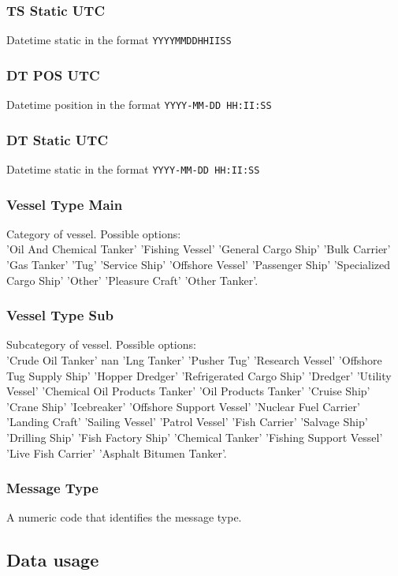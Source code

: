         \subsubsection{TS Static UTC}
            Datetime static in the format \verb|YYYYMMDDHHIISS|
        \subsubsection{DT POS UTC}
            Datetime position in the format \verb|YYYY-MM-DD HH:II:SS|
        \subsubsection{DT Static UTC}
            Datetime static in the format \verb|YYYY-MM-DD HH:II:SS|
        \subsubsection{Vessel Type Main}
            Category of vessel. Possible options:\\ 'Oil And Chemical Tanker' 'Fishing Vessel' 'General Cargo Ship' 'Bulk Carrier' 'Gas Tanker' 'Tug' 'Service Ship' 'Offshore Vessel' 'Passenger Ship' 'Specialized Cargo Ship' 'Other' 'Pleasure Craft' 'Other Tanker'.
        \subsubsection{Vessel Type Sub}
            Subcategory of vessel. Possible options:\\ 'Crude Oil Tanker' nan 'Lng Tanker' 'Pusher Tug' 'Research Vessel' 'Offshore Tug Supply Ship' 'Hopper Dredger' 'Refrigerated Cargo Ship' 'Dredger' 'Utility Vessel' 'Chemical Oil Products Tanker' 'Oil Products Tanker' 'Cruise Ship' 'Crane Ship' 'Icebreaker' 'Offshore Support Vessel' 'Nuclear Fuel Carrier' 'Landing Craft' 'Sailing Vessel' 'Patrol Vessel' 'Fish Carrier' 'Salvage Ship' 'Drilling Ship' 'Fish Factory Ship' 'Chemical Tanker' 'Fishing Support Vessel' 'Live Fish Carrier' 'Asphalt Bitumen Tanker'.
        \subsubsection{Message Type}
            A numeric code that identifies the message type.
        
    \subsection{Data usage}
    
